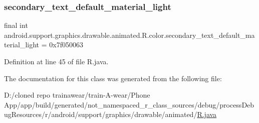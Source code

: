 \subsubsection{\texorpdfstring{secondary\_text\_default\_material\_light}{secondary\_text\_default\_material\_light}}
{\footnotesize\ttfamily final int android.\+support.\+graphics.\+drawable.\+animated.\+R.\+color.\+secondary\+\_\+text\+\_\+default\+\_\+material\+\_\+light = 0x7f050063\hspace{0.3cm}{\ttfamily [static]}}



Definition at line 45 of file R.\+java.



The documentation for this class was generated from the following file\+:\begin{DoxyCompactItemize}
\item 
D\+:/cloned repo trainawear/train-\/\+A-\/wear/\+Phone App/app/build/generated/not\+\_\+namespaced\+\_\+r\+\_\+class\+\_\+sources/debug/process\+Debug\+Resources/r/android/support/graphics/drawable/animated/\mbox{\hyperlink{process_debug_resources_2r_2android_2support_2graphics_2drawable_2animated_2_r_8java}{R.\+java}}\end{DoxyCompactItemize}
